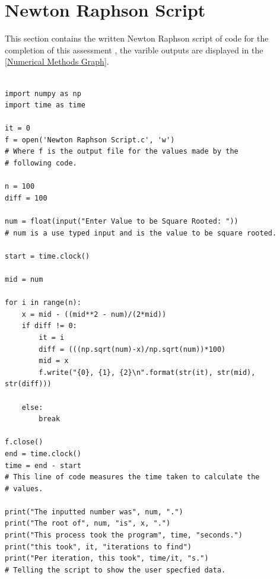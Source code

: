 \documentclass[12pt]{article}
\begin{document}

\section{Newton Raphson Script}
\label{S5}

This section contains the written Newton Raphson script of code for the completion of this assessment \cite{Numerical_Methods}, the varible outputs are displayed in the \cref{Numerical Methods Graph}.

\begin{verbatim}

import numpy as np
import time as time

it = 0
f = open('Newton Raphson Script.c', 'w')
# Where f is the output file for the values made by the 
# following code.

n = 100
diff = 100

num = float(input("Enter Value to be Square Rooted: "))
# num is a use typed input and is the value to be square rooted.

start = time.clock()

mid = num
    
for i in range(n):
    x = mid - ((mid**2 - num)/(2*mid))
    if diff != 0:
        it = i
        diff = (((np.sqrt(num)-x)/np.sqrt(num))*100)
        mid = x
        f.write("{0}, {1}, {2}\n".format(str(it), str(mid), str(diff)))
        
    else:
        break
    
f.close()
end = time.clock()
time = end - start
# This line of code measures the time taken to calculate the 
# values.

print("The inputted number was", num, ".")
print("The root of", num, "is", x, ".")
print("This process took the program", time, "seconds.")
print("this took", it, "iterations to find")
print("Per iteration, this took", time/it, "s.")
# Telling the script to show the user specfied data.

\end{verbatim}






\pagebreak
\inputminted[breaklines]{tex}{main.tex}
\pagebreak
\inputminted[breaklines]{tex}{mybib.bib}
\end{document}
